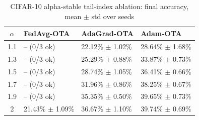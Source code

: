 \begin{table}[!htbp]
    \centering
    \small
    \caption{CIFAR-10 alpha-stable tail-index ablation: final accuracy, mean $\pm$ std over seeds}
    \label{tab:alpha-ablation}
    \begin{tabular}{c|p{}p{}p{}}
        \hline
        $\alpha$ & FedAvg-OTA & AdaGrad-OTA & Adam-OTA \\
        \hline
        1.1 & -- (0/3 ok) & 22.12\% $\pm$ 1.02\% & 28.64\% $\pm$ 1.68\% \\
        1.3 & -- (0/3 ok) & 25.29\% $\pm$ 0.88\% & 33.87\% $\pm$ 0.73\% \\
        1.5 & -- (0/3 ok) & 28.74\% $\pm$ 1.05\% & 36.41\% $\pm$ 0.66\% \\
        1.7 & -- (0/3 ok) & 31.96\% $\pm$ 0.86\% & 38.25\% $\pm$ 0.67\% \\
        1.9 & -- (0/3 ok) & 35.35\% $\pm$ 0.50\% & 39.65\% $\pm$ 0.73\% \\
        2 & 21.43\% $\pm$ 1.09\% & 36.67\% $\pm$ 1.10\% & 39.74\% $\pm$ 0.69\% \\
        \hline
    \end{tabular}
\end{table}
